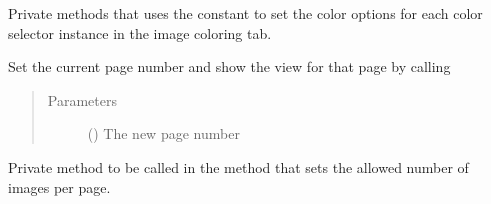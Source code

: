 \documentclass[letterpaper,10pt,english]{sphinxmanual}
\begin{document}
\begin{fulllineitems}
\begin{fulllineitems}
\end{fulllineitems}


\begin{fulllineitems}
\label{\detokenize{polo.widgets:polo.widgets.plate_inspector_widget.PlateInspectorWidget._set_color_options}}
Private methods that uses the  constant to set the color options 
for each color selector  instance in the image coloring tab.

\end{fulllineitems}


\begin{fulllineitems}
\label{\detokenize{polo.widgets:polo.widgets.plate_inspector_widget.PlateInspectorWidget._set_current_page}}
Set the current page number and show the view for that page by
calling 
\begin{quote}\begin{description}
\item[{Parameters}] \leavevmode
{} () \textendash{} The new page number

\end{description}\end{quote}

\end{fulllineitems}


\begin{fulllineitems}
\label{\detokenize{polo.widgets:polo.widgets.plate_inspector_widget.PlateInspectorWidget._set_image_count_options}}
Private method to be called in the  method that sets
the allowed number of images per page.


\end{fulllineitems}
\end{fulllineitems}
\end{document}
